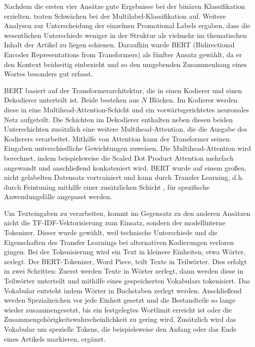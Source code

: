 Nachdem die ersten vier Ansätze gute Ergebnisse bei der binären Klassifikation erzielten, traten Schwächen bei der Multilabel-Klassifikation auf. Weitere Analysen zur Unterscheidung der einzelnen Promotional Labels ergaben, dass die wesentlichen Unterschiede weniger in der Struktur als vielmehr im thematischen Inhalt der Artikel zu liegen schienen. Daraufhin wurde BERT (Bidirectional Encoder Representations from Transformers) als fünfter Ansatz gewählt, da er den Kontext beidseitig einbezieht und so den umgebenden Zusammenhang eines Wortes besonders gut erfasst.

BERT basiert auf der Transformerarchitektur, die in einen Kodierer und einen Dekodierer unterteilt ist. Beide bestehen aus $N$ Blöcken. Im Kodierer werden diese in eine Multihead-Attention-Schicht und ein vorwärtsgerichtetes neuronales Netz aufgeteilt. Die Schichten im Dekodierer enthalten neben diesen beiden Unterschichten zusätzlich eine weitere Multihead-Attention, die die Ausgabe des Kodierers verarbeitet. Mithilfe von Attention kann der Transformer seinen Eingaben unterschiedliche Gewichtungen zuweisen. Die Multihead-Attention wird berechnet, indem beispielsweise die Scaled Dot Product Attention \cite{Vaswani2017} mehrfach angewandt und anschließend konkateniert wird. BERT wurde auf einem großen, nicht gelabelten Datensatz vortrainiert und kann durch Transfer Learning, d.h. durch Feintuning mithilfe einer zusätzlichen Schicht \cite{Devlin2018}, für spezifische Anwendungsfälle angepasst werden.

Um Texteingaben zu verarbeiten, kommt im Gegensatz zu den anderen Ansätzen nicht die TF-IDF-Vektorisierung zum Einsatz, sondern der modellinterne Tokenizer. Dieser wurde gewählt, weil technische Unterschiede und die Eigenschaften des Transfer Learnings bei alternativen Kodierungen verloren gingen. Bei der Tokenisierung wird ein Text in kleinere Einheiten, etwa Wörter, zerlegt. Der BERT-Tokenizer, Word Piece, teilt Texte in Teilwörter. Dies erfolgt in zwei Schritten: Zuerst werden Texte in Wörter zerlegt, dann werden diese in Teilwörter unterteilt und mithilfe eines gespeicherten Vokabulars tokenisiert. Das Vokabular entsteht indem Wörter in Buchstaben zerlegt werden. Anschließend werden Spezialzeichen vor jede Einheit gesetzt und die Bestandteile so lange wieder zusammengesetzt, bis ein festgelegtes Wortlimit erreicht ist oder die Zusammengehörigkeitswahrscheinlichkeit zu gering wird. Zusätzlich wird das Vokabular um spezielle Tokens, die beispielsweise den Anfang oder das Ende eines Artikels markieren, ergänzt.

